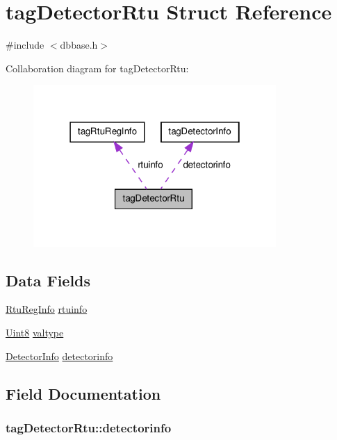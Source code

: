 \hypertarget{structtagDetectorRtu}{\section{tag\-Detector\-Rtu Struct Reference}
\label{structtagDetectorRtu}
}


{\ttfamily \#include $<$dbbase.\-h$>$}



Collaboration diagram for tag\-Detector\-Rtu\-:\nopagebreak
\begin{figure}[H]
\begin{center}
\leavevmode
\includegraphics[width=262pt]{structtagDetectorRtu__coll__graph}
\end{center}
\end{figure}
\subsection*{Data Fields}
\begin{DoxyCompactItemize}
\item 
\hyperlink{dbbase_8h_a4f06859d090e81c1be0c142757ce6e11}{Rtu\-Reg\-Info} \hyperlink{structtagDetectorRtu_a9ad49016d3a6175a0433542958700191}{rtuinfo}
\item 
\hyperlink{base_8h_af84840501dec18061d18a68c162a8fa2}{Uint8} \hyperlink{structtagDetectorRtu_a0f28dc3321e8b27c35cea8c6744b254c}{valtype}
\item 
\hyperlink{dbbase_8h_ad2f585e869326603674b61434f883d30}{Detector\-Info} \hyperlink{structtagDetectorRtu_af07f13df3b5322a3994813aff2bf85e7}{detectorinfo}
\end{DoxyCompactItemize}


\subsection{Field Documentation}
\hypertarget{structtagDetectorRtu_af07f13df3b5322a3994813aff2bf85e7}{
\subsubsection[{detectorinfo}]{ tag\-Detector\-Rtu\-::detectorinfo}}\label{structtagDetectorRtu_af07f13df3b5322a3994813aff2bf85e7}


